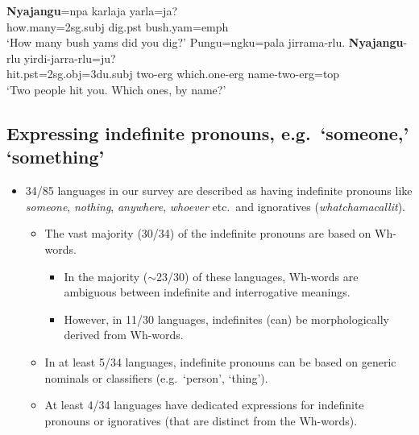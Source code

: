 \documentclass{article}
\makeatletter
\newcommand{\ofy}{/85} %
\makeatother
\begin{document}
\begin{exe}
\begin{xlist}
\ex \gll \textbf{Nyajangu}=npa karlaja yarla=ja? \\
how.many=2{\sc sg.subj} dig.{\sc pst} bush.yam={\sc emph}\\
\glt `How many bush yams did you dig?'
\ex \gll Pungu=ngku=pala jirrama-rlu. \textbf{Nyajangu}-rlu yirdi-jarra-rlu=ju? \\
hit.{\sc pst}=2{\sc sg.obj}=3{\sc du.subj} two-{\sc erg} which.one-{\sc erg} name-two-{\sc erg}={\sc top}\\
\glt `Two people hit you. Which ones, by name?'
\end{xlist}
 \end{exe}


\subsection{Expressing indefinite pronouns, e.g.\ `someone,' `something'}
\begin{itemize}
\item 34\ofy{} languages  in our survey are described as having indefinite pronouns like \textit{someone}, \textit{nothing}, \textit{anywhere}, \textit{whoever} etc.\ and ignoratives (\textit{whatchamacallit}).

  \begin{itemize}
  \item The vast majority (30/34) of the  indefinite pronouns are based on Wh-words.
  \begin{itemize}
  \item In the majority ($\sim$23/30) of these languages, Wh-words are  ambiguous between indefinite and interrogative meanings.
  \item However, in 11/30 languages, indefinites (can) be morphologically derived from Wh-words.
  \end{itemize}
  \item In at least 5/34 languages,  indefinite pronouns can be based on generic nominals or classifiers (e.g.\ `person', `thing').
    \item At least 4/34 languages have dedicated expressions for indefinite pronouns or ignoratives (that are distinct from the Wh-words).
  \end{itemize}
\end{itemize}
\end{document}
